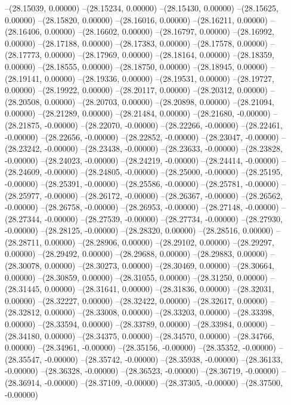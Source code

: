 --(28.15039, 0.00000)
--(28.15234, 0.00000)
--(28.15430, 0.00000)
--(28.15625, 0.00000)
--(28.15820, 0.00000)
--(28.16016, 0.00000)
--(28.16211, 0.00000)
--(28.16406, 0.00000)
--(28.16602, 0.00000)
--(28.16797, 0.00000)
--(28.16992, 0.00000)
--(28.17188, 0.00000)
--(28.17383, 0.00000)
--(28.17578, 0.00000)
--(28.17773, 0.00000)
--(28.17969, 0.00000)
--(28.18164, 0.00000)
--(28.18359, 0.00000)
--(28.18555, 0.00000)
--(28.18750, 0.00000)
--(28.18945, 0.00000)
--(28.19141, 0.00000)
--(28.19336, 0.00000)
--(28.19531, 0.00000)
--(28.19727, 0.00000)
--(28.19922, 0.00000)
--(28.20117, 0.00000)
--(28.20312, 0.00000)
--(28.20508, 0.00000)
--(28.20703, 0.00000)
--(28.20898, 0.00000)
--(28.21094, 0.00000)
--(28.21289, 0.00000)
--(28.21484, 0.00000)
--(28.21680, -0.00000)
--(28.21875, -0.00000)
--(28.22070, -0.00000)
--(28.22266, -0.00000)
--(28.22461, -0.00000)
--(28.22656, -0.00000)
--(28.22852, -0.00000)
--(28.23047, -0.00000)
--(28.23242, -0.00000)
--(28.23438, -0.00000)
--(28.23633, -0.00000)
--(28.23828, -0.00000)
--(28.24023, -0.00000)
--(28.24219, -0.00000)
--(28.24414, -0.00000)
--(28.24609, -0.00000)
--(28.24805, -0.00000)
--(28.25000, -0.00000)
--(28.25195, -0.00000)
--(28.25391, -0.00000)
--(28.25586, -0.00000)
--(28.25781, -0.00000)
--(28.25977, -0.00000)
--(28.26172, -0.00000)
--(28.26367, -0.00000)
--(28.26562, -0.00000)
--(28.26758, -0.00000)
--(28.26953, -0.00000)
--(28.27148, -0.00000)
--(28.27344, -0.00000)
--(28.27539, -0.00000)
--(28.27734, -0.00000)
--(28.27930, -0.00000)
--(28.28125, -0.00000)
--(28.28320, 0.00000)
--(28.28516, 0.00000)
--(28.28711, 0.00000)
--(28.28906, 0.00000)
--(28.29102, 0.00000)
--(28.29297, 0.00000)
--(28.29492, 0.00000)
--(28.29688, 0.00000)
--(28.29883, 0.00000)
--(28.30078, 0.00000)
--(28.30273, 0.00000)
--(28.30469, 0.00000)
--(28.30664, 0.00000)
--(28.30859, 0.00000)
--(28.31055, 0.00000)
--(28.31250, 0.00000)
--(28.31445, 0.00000)
--(28.31641, 0.00000)
--(28.31836, 0.00000)
--(28.32031, 0.00000)
--(28.32227, 0.00000)
--(28.32422, 0.00000)
--(28.32617, 0.00000)
--(28.32812, 0.00000)
--(28.33008, 0.00000)
--(28.33203, 0.00000)
--(28.33398, 0.00000)
--(28.33594, 0.00000)
--(28.33789, 0.00000)
--(28.33984, 0.00000)
--(28.34180, 0.00000)
--(28.34375, 0.00000)
--(28.34570, 0.00000)
--(28.34766, 0.00000)
--(28.34961, -0.00000)
--(28.35156, -0.00000)
--(28.35352, -0.00000)
--(28.35547, -0.00000)
--(28.35742, -0.00000)
--(28.35938, -0.00000)
--(28.36133, -0.00000)
--(28.36328, -0.00000)
--(28.36523, -0.00000)
--(28.36719, -0.00000)
--(28.36914, -0.00000)
--(28.37109, -0.00000)
--(28.37305, -0.00000)
--(28.37500, -0.00000)

